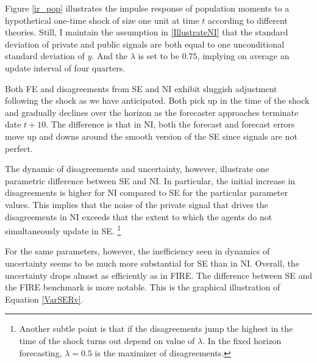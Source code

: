 \documentclass[]{article}
\begin{document}
	Figure \ref{ir_pop} illustrates the impulse response of population moments to a hypothetical one-time shock of size one unit at time $t$ according to different theories. Still, I maintain the assumption in \ref{IllustrateNI} that the standard deviation of private and public signals are both equal to one unconditional standard deviation of $y$.  And the $\lambda$ is set to be $0.75$, implying on average an update interval of four quarters.  
	
	
	Both FE and disagreements from SE and NI exhibit sluggish adjustment following the shock as we have anticipated. Both pick up in the time of the shock and gradually declines over the horizon as the forecaster approaches terminate date $t+10$. The difference is that in NI, both the forecast and forecast errors move up and downs around the smooth version of the SE since signals are not perfect. 
	
	The dynamic of disagreements and uncertainty, however,  illustrate one parametric difference between SE and NI. In particular,  the initial increase in disagreements is higher for NI compared to SE for the particular parameter values. This implies that the noise of the private signal that drives the disagreements in NI exceeds that the extent to which the agents do not simultaneously update in SE. \footnote{Another subtle point is that if the disagreements jump the highest in the time of the shock turns out depend on value of $\lambda$. In the fixed horizon forecasting, $\lambda=0.5$ is the maximizer of disagreements.}
	
	For the same parameters, however, the inefficiency seen in dynamics of uncertainty seems to be much more substantial for SE than in NI. Overall, the uncertainty drops almost as efficiently as in FIRE. The difference between SE and the FIRE benchmark is more notable. This is the graphical illustration of Equation \ref{VarSERv}. 
	
\end{document}
